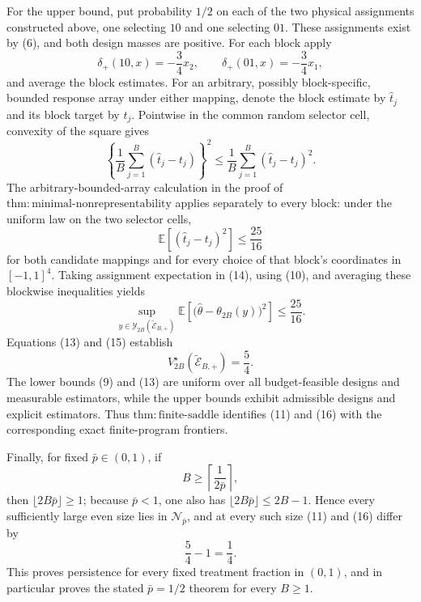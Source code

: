 For the upper bound, put probability \(1/2\) on each of the two physical
assignments constructed above, one selecting \(10\) and one selecting
\(01\).  These assignments exist by (6), and both design masses are positive.
For each block apply
\[
 \delta_+(10,x)=-\frac34x_2,
 \qquad
 \delta_+(01,x)=-\frac34x_1,
\]
and average the block estimates.  For an arbitrary, possibly block-specific,
bounded response array under either mapping, denote the block estimate by
\(\widehat t_j\) and its block target by \(t_j\).  Pointwise in the common
random selector cell, convexity of the square gives
\[
 \left\{\frac1B\sum_{j=1}^B(\widehat t_j-t_j)\right\}^2
 \le\frac1B\sum_{j=1}^B(\widehat t_j-t_j)^2. \tag{14}
\]
The arbitrary-bounded-array calculation in the proof of
\(\mathrm{thm{:}minimal\text{-}nonrepresentability}\) applies separately
to every block: under the uniform law on the two selector cells,
\[
 \mathbb E[(\widehat t_j-t_j)^2]\le\frac{25}{16}
\]
for both candidate mappings and for every choice of that block's coordinates
in \([-1,1]^4\).  Taking assignment expectation in (14), using (10), and
averaging these blockwise inequalities yields
\[
 \sup_{y\in\mathcal Y_{2B}(\widetilde{\mathcal E}_{B,+})}
 \mathbb E\!\left[
   \bigl(\widehat\theta-\theta_{2B}(y)\bigr)^2
 \right]
 \le\frac{25}{16}. \tag{15}
\]
Equations (13) and (15) establish
\[
 V_{2B}^\star(\widetilde{\mathcal E}_{B,+})=\frac54. \tag{16}
\]
The lower bounds (9) and (13) are uniform over all budget-feasible designs
and measurable estimators, while the upper bounds exhibit admissible designs
and explicit estimators.  Thus
\(\mathrm{thm{:}finite\text{-}saddle}\) identifies (11) and (16) with the
corresponding exact finite-program frontiers.

Finally, for fixed \(\bar p\in(0,1)\), if
\[
 B\ge \left\lceil\frac{1}{2\bar p}\right\rceil,
\]
then \(\lfloor2B\bar p\rfloor\ge1\); because \(\bar p<1\), one also has
\(\lfloor2B\bar p\rfloor\le2B-1\).  Hence every sufficiently large even
size lies in \(\mathcal N_{\bar p}\), and at every such size (11) and (16)
differ by
\[
 \frac54-1=\frac14.
\]
This proves persistence for every fixed treatment fraction in \((0,1)\),
and in particular proves the stated \(\bar p=1/2\) theorem for every
\(B\ge1\).